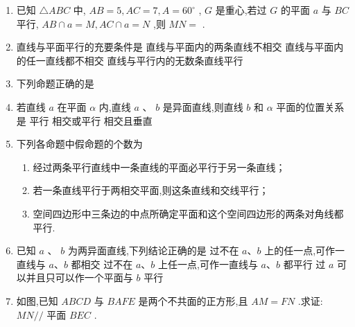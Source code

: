 \begin{enumerate}
    
    \item 已知 $ \bigtriangleup  {ABC} $ 中, $ {AB} = 5,{AC} = 7,A = {60}^{ \circ  } $ , $ G $ 是重心,若过 $ G $ 的平面 $ a $ 与 $ {BC} $ 平行, $ {AB} \cap  a = M,{AC} \cap  a = N $ ,则 $ {MN} = $ .

    
    \item 直线与平面平行的充要条件是 
     {直线与平面内的两条直线不相交}
    {直线与平面内的任一直线都不相交} {直线与平行内的无数条直线平行}

    \item 下列命题正确的是 


    \item 若直线 $ a $ 在平面 $ \alpha $ 内,直线 $ a $ 、 $ b $ 是异面直线,则直线 $ b $ 和 $ \alpha $ 平面的位置关系是 
     {平行} {相交或平行} {相交且垂直}

    \item 下列各命题中假命题的个数为
    \begin{enumerate}
        \item 经过两条平行直线中一条直线的平面必平行于另一条直线；
        \item 若一条直线平行于两相交平面,则这条直线和交线平行；
        \item 空间四边形中三条边的中点所确定平面和这个空间四边形的两条对角线都
平行.
    \end{enumerate}

    \item 已知 $ a $ 、 $ b $ 为两异面直线,下列结论正确的是
    {过不在 $ a\text{、}b $ 上的任一点,可作一直线与 $ a\text{、}b $ 都相交}
    {过不在 $ a\text{、}b $ 上任一点,可作一直线与 $ a\text{、}b $ 都平行}
    {过 $ a $ 可以并且只可以作一个平面与 $ b $ 平行}

    
    \item 如图,已知 $ {{ABCD}} $ 与 $ {{BAFE}} $ 是两个不共面的正方形,且 $ {{AM}} = {{FN}} $ .求证: $ {{MN}}// $ 平面 $ {{BEC}} $ .
    
    \begin{center}


\end{center}
\end{enumerate}
